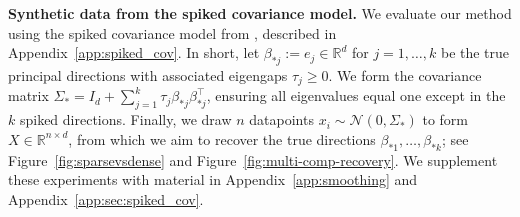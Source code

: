 \documentclass{article}
\begin{document}
\textbf{Synthetic data from the spiked covariance model.} We evaluate our method using the spiked covariance model from \cite[ch. 8.2.2]{wainwright_high-dimensional_2019}, described in Appendix~\ref{app:spiked_cov}. In short, let $\beta_{*j} := e_j \in \mathbb{R}^d$ for $j = 1,\dots,k$ be the true principal directions with associated eigengaps $\tau_j \geq 0$. We form the covariance matrix $\Sigma_* = I_d + \sum_{j=1}^k \tau_j \beta_{*j} \beta_{*j}^\top$, ensuring all eigenvalues equal one except in the $k$ spiked directions. Finally, we draw $n$ datapoints $x_i \sim \mathcal{N}(0,\Sigma_*)$ to form $X \in \mathbb{R}^{n \times d}$, from which we aim to recover the true directions $\beta_{*1}, \dots,\beta_{*k}$; see Figure~\ref{fig:sparsevsdense} and Figure~\ref{fig:multi-comp-recovery}. We supplement these experiments with material in Appendix~\ref{app:smoothing} and Appendix~\ref{app:sec:spiked_cov}.
\end{document}
